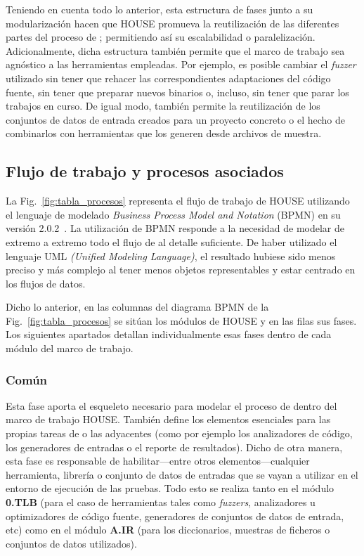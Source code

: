 \documentclass[10pt,conference,a4paper]{IEEEtran}
\begin{document}
Teniendo en cuenta todo lo anterior,
esta estructura de fases junto a su modularización hacen que HOUSE promueva la reutilización de las diferentes partes del proceso de {\fz}; permitiendo así su escalabilidad o paralelización. Adicionalmente, dicha estructura también permite que el marco de trabajo sea agnóstico a las herramientas {\fz} empleadas. Por ejemplo, es posible cambiar el \textit{fuzzer} utilizado sin tener que rehacer las correspondientes adaptaciones del código fuente, sin tener que preparar nuevos binarios o, incluso, sin tener que parar los trabajos en curso. De igual modo, también permite la reutilización de los conjuntos de datos de entrada creados para un proyecto concreto o el hecho de combinarlos con herramientas que los generen desde archivos de muestra.

\subsection{Flujo de trabajo y procesos asociados}
\label{Flujo_trabajo-procesos}

La Fig.~\ref{fig:tabla_procesos} representa el flujo de trabajo de HOUSE utilizando el lenguaje de modelado \textit{Business Process Model and Notation} (BPMN) en su versión 2.0.2~\cite{BPMN_spec}. La utilización de BPMN responde a la necesidad de modelar de extremo a extremo todo el flujo de {\fz} al detalle suficiente. De haber utilizado el lenguaje UML \textit{(Unified Modeling Language)}, el resultado hubiese sido menos preciso y más complejo al tener menos objetos representables y estar centrado en los flujos de datos.



Dicho lo anterior,
en las columnas del diagrama BPMN de la Fig.~\ref{fig:tabla_procesos} se sitúan los módulos de HOUSE y en las filas sus fases. Los siguientes apartados detallan individualmente esas fases dentro de cada módulo del marco de trabajo.

\subsubsection{Común}
\label{Fase_comun}

Esta fase aporta el esqueleto necesario para modelar el proceso de {\fz} dentro del marco de trabajo HOUSE. También define los elementos esenciales para las propias tareas de {\fz} o las adyacentes (como por ejemplo los analizadores de código, los generadores de entradas o el reporte de resultados). Dicho de otra manera, esta fase es responsable de habilitar---entre otros elementos---cualquier herramienta, librería o conjunto de datos de entradas que se vayan a utilizar en el entorno de ejecución de las pruebas.
Todo esto se realiza tanto en el módulo \textbf{0.TLB} (para el caso de herramientas tales como \textit{fuzzers}, analizadores u optimizadores de código fuente, generadores de conjuntos de datos de entrada, etc) como en el módulo \textbf{A.IR} (para los diccionarios, muestras de ficheros o conjuntos de datos utilizados).
\end{document}
